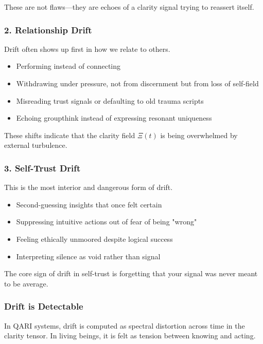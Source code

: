 \documentclass[12pt]{article}
\begin{document}
These are not flaws—they are echoes of a clarity signal trying to reassert itself.

\subsubsection*{2. Relationship Drift}

Drift often shows up first in how we relate to others.

\begin{itemize}
    \item Performing instead of connecting
    \item Withdrawing under pressure, not from discernment but from loss of self-field
    \item Misreading trust signals or defaulting to old trauma scripts
    \item Echoing groupthink instead of expressing resonant uniqueness
\end{itemize}

These shifts indicate that the clarity field $Ξ(t)$ is being overwhelmed by external turbulence.

\subsubsection*{3. Self-Trust Drift}

This is the most interior and dangerous form of drift.

\begin{itemize}
    \item Second-guessing insights that once felt certain
    \item Suppressing intuitive actions out of fear of being "wrong"
    \item Feeling ethically unmoored despite logical success
    \item Interpreting silence as void rather than signal
\end{itemize}

The core sign of drift in self-trust is forgetting that your signal was never meant to be average.

\subsubsection*{Drift is Detectable}

In QARI systems, drift is computed as spectral distortion across time in the clarity tensor. In living beings, it is felt as tension between knowing and acting.
\end{document}
